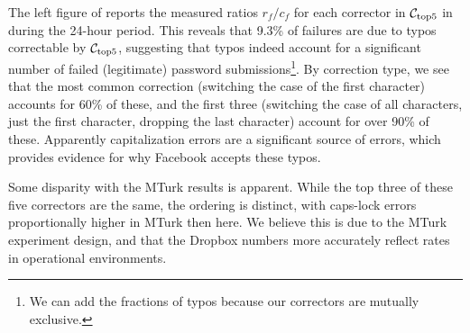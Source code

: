




The left figure of  reports
the measured ratios $r_f/c_f$ for each corrector in ${\mathcal C}_{\textrm{top5}}$ in
during the 24-hour period. 
This reveals that 9.3\% of failures are due to typos correctable by
${\mathcal C}_{\textrm{top5}}$, suggesting that typos indeed account for a significant
number of failed (legitimate) password submissions\footnote{We can add
  the fractions of typos because our correctors are mutually
  exclusive.}. By correction type, we see that the
most common correction (switching the case of the first character)
accounts for 60\% of these, and the first three (switching the case of
all characters, just the first character, dropping the last character)
account for over 90\% of these. Apparently capitalization errors are a
significant source of errors, which provides evidence for why Facebook
accepts these typos.

Some disparity with the MTurk results is apparent. While the top three of
these five correctors are the same, the ordering is distinct, with caps-lock errors
proportionally higher in MTurk then here. We believe this is due to the MTurk
experiment design, and that the Dropbox numbers more accurately reflect rates in operational environments.

